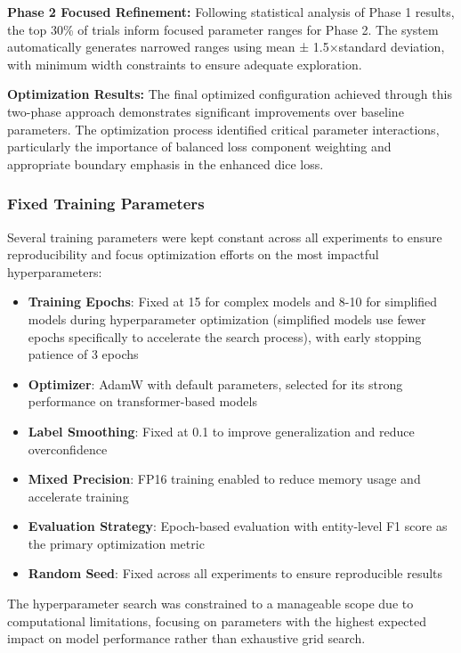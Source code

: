 \documentclass[a4paper]{usiinfbachelorproject}
\begin{document}
\textbf{Phase 2 Focused Refinement:}
Following statistical analysis of Phase 1 results, the top 30\% of trials inform focused parameter ranges for Phase 2. The system automatically generates narrowed ranges using mean ± 1.5×standard deviation, with minimum width constraints to ensure adequate exploration.

\textbf{Optimization Results:}
The final optimized configuration achieved through this two-phase approach demonstrates significant improvements over baseline parameters. The optimization process identified critical parameter interactions, particularly the importance of balanced loss component weighting and appropriate boundary emphasis in the enhanced dice loss.
\subsubsection{Fixed Training Parameters}

Several training parameters were kept constant across all experiments to ensure reproducibility and focus optimization efforts on the most impactful hyperparameters:

\begin{itemize}
    \item \textbf{Training Epochs}: Fixed at 15 for complex models and 8-10 for simplified models during hyperparameter optimization (simplified models use fewer epochs specifically to accelerate the search process), with early stopping patience of 3 epochs
    \item \textbf{Optimizer}: AdamW with default parameters, selected for its strong performance on transformer-based models
    \item \textbf{Label Smoothing}: Fixed at 0.1 to improve generalization and reduce overconfidence
    \item \textbf{Mixed Precision}: FP16 training enabled to reduce memory usage and accelerate training    \item \textbf{Evaluation Strategy}: Epoch-based evaluation with entity-level F1 score as the primary optimization metric
    \item \textbf{Random Seed}: Fixed across all experiments to ensure reproducible results
\end{itemize}

The hyperparameter search was constrained to a manageable scope due to computational limitations, focusing on parameters with the highest expected impact on model performance rather than exhaustive grid search.
\end{document}
